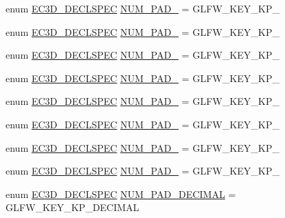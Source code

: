 \begin{DoxyCompactItemize}
\item 
enum \mbox{\hyperlink{_common_8h_aac42573e202ca3dd4d259c81691e2369}{E\+C3\+D\+\_\+\+D\+E\+C\+L\+S\+P\+EC}} \mbox{\hyperlink{classec_1_1_keyboard_a456fc67954c8173aeb9450d10b3b1d3c}{N\+U\+M\+\_\+\+P\+A\+D\+\_}} = G\+L\+F\+W\+\_\+\+K\+E\+Y\+\_\+\+K\+P\+\_
\item 
enum \mbox{\hyperlink{_common_8h_aac42573e202ca3dd4d259c81691e2369}{E\+C3\+D\+\_\+\+D\+E\+C\+L\+S\+P\+EC}} \mbox{\hyperlink{classec_1_1_keyboard_abd3ad06b0229df388156efe666662908}{N\+U\+M\+\_\+\+P\+A\+D\+\_}} = G\+L\+F\+W\+\_\+\+K\+E\+Y\+\_\+\+K\+P\+\_
\item 
enum \mbox{\hyperlink{_common_8h_aac42573e202ca3dd4d259c81691e2369}{E\+C3\+D\+\_\+\+D\+E\+C\+L\+S\+P\+EC}} \mbox{\hyperlink{classec_1_1_keyboard_a2fa7355ac90ada75403e6964ef373a7d}{N\+U\+M\+\_\+\+P\+A\+D\+\_}} = G\+L\+F\+W\+\_\+\+K\+E\+Y\+\_\+\+K\+P\+\_
\item 
enum \mbox{\hyperlink{_common_8h_aac42573e202ca3dd4d259c81691e2369}{E\+C3\+D\+\_\+\+D\+E\+C\+L\+S\+P\+EC}} \mbox{\hyperlink{classec_1_1_keyboard_ab1fe2bc49a3287ac92b32006dfc046c8}{N\+U\+M\+\_\+\+P\+A\+D\+\_}} = G\+L\+F\+W\+\_\+\+K\+E\+Y\+\_\+\+K\+P\+\_
\item 
enum \mbox{\hyperlink{_common_8h_aac42573e202ca3dd4d259c81691e2369}{E\+C3\+D\+\_\+\+D\+E\+C\+L\+S\+P\+EC}} \mbox{\hyperlink{classec_1_1_keyboard_ac06ec74ae84452fda7be4ea0c69738b2}{N\+U\+M\+\_\+\+P\+A\+D\+\_}} = G\+L\+F\+W\+\_\+\+K\+E\+Y\+\_\+\+K\+P\+\_
\item 
enum \mbox{\hyperlink{_common_8h_aac42573e202ca3dd4d259c81691e2369}{E\+C3\+D\+\_\+\+D\+E\+C\+L\+S\+P\+EC}} \mbox{\hyperlink{classec_1_1_keyboard_aaaca0509bb330fc1402064d32cc85b9e}{N\+U\+M\+\_\+\+P\+A\+D\+\_}} = G\+L\+F\+W\+\_\+\+K\+E\+Y\+\_\+\+K\+P\+\_
\item 
enum \mbox{\hyperlink{_common_8h_aac42573e202ca3dd4d259c81691e2369}{E\+C3\+D\+\_\+\+D\+E\+C\+L\+S\+P\+EC}} \mbox{\hyperlink{classec_1_1_keyboard_a853e5fefb7cf1d53efcf268504118325}{N\+U\+M\+\_\+\+P\+A\+D\+\_}} = G\+L\+F\+W\+\_\+\+K\+E\+Y\+\_\+\+K\+P\+\_
\item 
enum \mbox{\hyperlink{_common_8h_aac42573e202ca3dd4d259c81691e2369}{E\+C3\+D\+\_\+\+D\+E\+C\+L\+S\+P\+EC}} \mbox{\hyperlink{classec_1_1_keyboard_ad2a8888dce13abd7a8ebadf78978262d}{N\+U\+M\+\_\+\+P\+A\+D\+\_}} = G\+L\+F\+W\+\_\+\+K\+E\+Y\+\_\+\+K\+P\+\_
\item 
enum \mbox{\hyperlink{_common_8h_aac42573e202ca3dd4d259c81691e2369}{E\+C3\+D\+\_\+\+D\+E\+C\+L\+S\+P\+EC}} \mbox{\hyperlink{classec_1_1_keyboard_a7fb474a14a119bb7f51b05aa38db37d8}{N\+U\+M\+\_\+\+P\+A\+D\+\_\+\+D\+E\+C\+I\+M\+AL}} = G\+L\+F\+W\+\_\+\+K\+E\+Y\+\_\+\+K\+P\+\_\+\+D\+E\+C\+I\+M\+AL

\end{DoxyCompactItemize}
